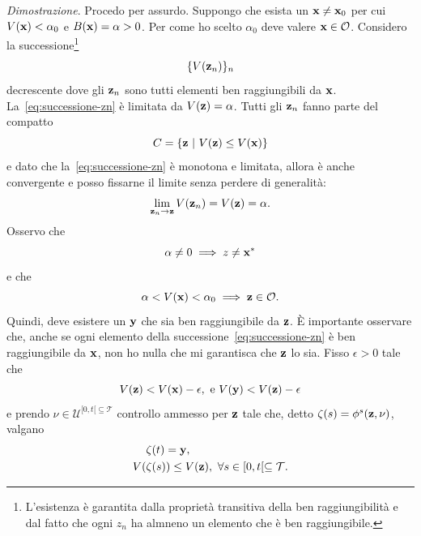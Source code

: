 \begin{steps}
    \emph{Dimostrazione}.
    Procedo per assurdo.
    Suppongo che esista un $\mathbf{x} \neq \mathbf{x}_0$ per cui $V(\mathbf{x}) < \alpha_0$
    e $B(\mathbf{x}) = \alpha > 0$.
    Per come ho scelto $\alpha_0$ deve valere $\mathbf{x} \in \mathcal O$.
    Considero la successione\footnote{L'esistenza
    è garantita dalla proprietà transitiva della ben raggiungibilità e dal fatto che
    ogni $z_n$ ha almneno un elemento che è ben raggiungibile.}
    \begin{equation}
        \{V(\mathbf{z}_n)\}_n
        \label{eq:successione-zn}
    \end{equation}
    decrescente dove gli $\mathbf{z}_n$ sono tutti elementi ben raggiungibili da $\mathbf{x}$.
    La~\eqref{eq:successione-zn} è limitata da $V(\mathbf{z}) = \alpha$.
    Tutti gli $\mathbf{z}_n$ fanno parte del compatto
    \begin{equation*}
        C = \left\{\mathbf{z} \ |\ V(\mathbf{z}) \leq V(\mathbf{x}) \right\}
    \end{equation*}
    e dato che la~\eqref{eq:successione-zn} è monotona e limitata,
    allora è anche convergente e posso fissarne il limite senza perdere
    di generalità:
    \begin{equation}
        \lim_{\mathbf{z}_n \to \mathbf{z}} V(\mathbf{z}_n) = V(\mathbf{z}) = \alpha.
        \label{eq:vzequalsalpha}
    \end{equation}
    Osservo che
    \begin{equation*}
        \alpha \neq 0 \implies z \neq \mathbf{x}^*
    \end{equation*}
    e che
    \begin{equation*}
        \alpha < V(\mathbf{x}) < \alpha_0 \implies \mathbf{z} \in \mathcal O.
    \end{equation*}
    Quindi, deve esistere un $\mathbf{y}$ che sia ben raggiungibile da $\mathbf{z}$.
    È importante osservare che, anche se ogni elemento della successione~\eqref{eq:successione-zn}
    è ben raggiungibile da $\mathbf{x}$, non ho nulla che mi garantisca che $\mathbf{z}$ lo sia.
    Fisso $\epsilon > 0$ tale che
    \begin{equation}
        V(\b z) < V(\b x) - \epsilon,\ \text{e} \ V(\b y) < V(\b z) - \epsilon
        \label{eq:vy-less-vz}
    \end{equation}
    e prendo $\nu \in \mathcal U^{[0, t[ \subseteq \mathcal T}$ controllo ammesso
    per $\mathbf{z}$ tale che, detto $\zeta(s) = \phi^s(\mathbf{z}, \nu)$, valgano
    \begin{align*}
        &\zeta(t) = \b y, \\
        V(&\zeta(s)) \leq V(\b z), \ \forall s \in [0, t[ \subseteq \mathcal T.

\end{align*}
\end{steps}
